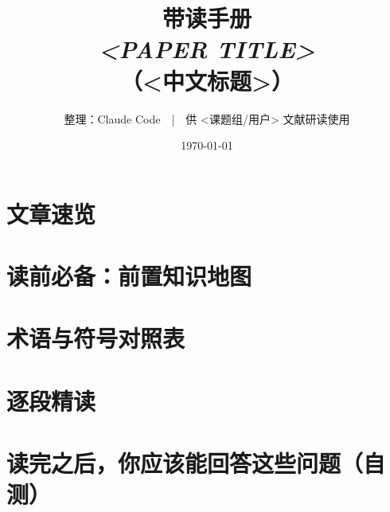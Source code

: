 \documentclass[11pt]{ctexart}
\title{\bfseries 带读手册\\[4pt]\large \textit{<PAPER TITLE>}\\[2pt]\normalsize （<中文标题>）}
\author{整理：Claude Code\ \ |\ \ 供 <课题组/用户> 文献研读使用}
\date{\today}
\begin{document}
\maketitle
\tableofcontents
\newpage

\section{文章速览}

\section{读前必备：前置知识地图}\label{sec:prereq}

\section{术语与符号对照表}

\section{逐段精读}

\section{读完之后，你应该能回答这些问题（自测）}

\begin{tip}[写作层面的启发]
\end{tip}
\end{document}
